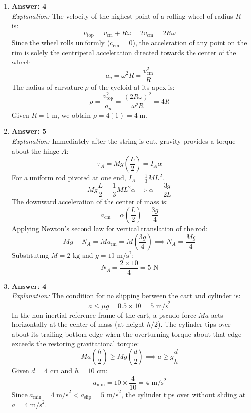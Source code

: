 \documentclass[11pt,a4paper]{article}
\begin{document}
\begin{enumerate}[label=\textbf{Q\arabic*.},leftmargin=24pt,itemsep=12pt,start=21]

  \item \textbf{Answer: 4}\\
  \textit{Explanation:} The velocity of the highest point of a rolling wheel of radius $R$ is:
  \[
    v_{\text{top}} = v_{\text{cm}} + R\omega = 2 v_{\text{cm}} = 2 R \omega
  \]
  Since the wheel rolls uniformly ($a_{\text{cm}} = 0$), the acceleration of any point on the rim is solely the centripetal acceleration directed towards the center of the wheel:
  \[
    a_n = \omega^2 R = \frac{v_{\text{cm}}^2}{R}
  \]
  The radius of curvature $\rho$ of the cycloid at its apex is:
  \[
    \rho = \frac{v_{\text{top}}^2}{a_n} = \frac{(2 R \omega)^2}{\omega^2 R} = 4R
  \]
  Given $R = 1\text{ m}$, we obtain $\rho = 4(1) = 4\text{ m}$.

  \item \textbf{Answer: 5}\\
  \textit{Explanation:} Immediately after the string is cut, gravity provides a torque about the hinge $A$:
  \[
    \tau_A = M g \left(\frac{L}{2}\right) = I_A \alpha
  \]
  For a uniform rod pivoted at one end, $I_A = \frac{1}{3} M L^2$.
  \[
    M g \frac{L}{2} = \frac{1}{3} M L^2 \alpha \implies \alpha = \frac{3g}{2L}
  \]
  The downward acceleration of the center of mass is:
  \[
    a_{\text{cm}} = \alpha \left(\frac{L}{2}\right) = \frac{3g}{4}
  \]
  Applying Newton's second law for vertical translation of the rod:
  \[
    M g - N_A = M a_{\text{cm}} = M \left(\frac{3g}{4}\right) \implies N_A = \frac{M g}{4}
  \]
  Substituting $M = 2\text{ kg}$ and $g = 10\text{ m/s}^2$:
  \[
    N_A = \frac{2 \times 10}{4} = 5\text{ N}
  \]

  \item \textbf{Answer: 4}\\
  \textit{Explanation:} The condition for no slipping between the cart and cylinder is:
  \[
    a \le \mu g = 0.5 \times 10 = 5\text{ m/s}^2
  \]
  In the non-inertial reference frame of the cart, a pseudo force $M a$ acts horizontally at the center of mass (at height $h/2$). The cylinder tips over about its trailing bottom edge when the overturning torque about that edge exceeds the restoring gravitational torque:
  \[
    M a \left(\frac{h}{2}\right) \ge M g \left(\frac{d}{2}\right) \implies a \ge g \frac{d}{h}
  \]
  Given $d = 4\text{ cm}$ and $h = 10\text{ cm}$:
  \[
    a_{\text{min}} = 10 \times \frac{4}{10} = 4\text{ m/s}^2
  \]
  Since $a_{\text{min}} = 4\text{ m/s}^2 < a_{\text{slip}} = 5\text{ m/s}^2$, the cylinder tips over without sliding at $a = 4\text{ m/s}^2$.


\end{enumerate}
\end{document}
